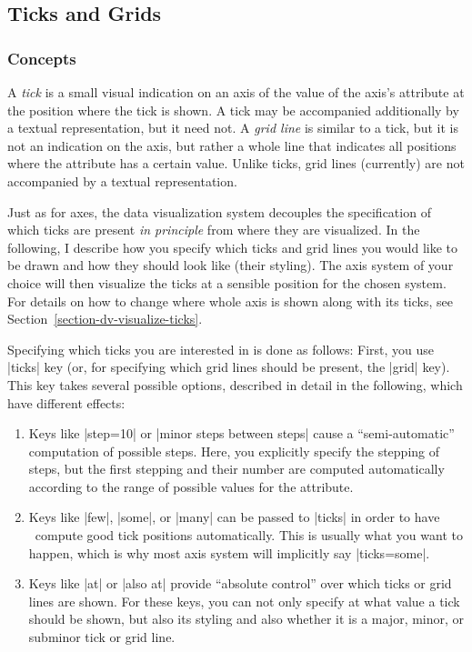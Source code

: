 \iffalse

\subsection{Ticks and Grids}
\label{section-dv-ticks-and-grids}

\subsubsection{Concepts}

A \emph{tick} is a small visual indication on an axis of the value of the axis's attribute at the position where the tick is shown. A tick may be accompanied additionally by a textual representation, but it need not. A \emph{grid line} is similar to a tick, but it is not an indication on the axis, but rather a whole line that indicates all positions where the attribute has a certain value. Unlike ticks, grid lines (currently) are not accompanied by a textual representation.

Just as for axes, the data visualization system decouples the specification of which ticks are present \emph{in principle} from where they are visualized. In the following, I describe how you specify which ticks and grid lines you would like to be drawn and how they should look like (their styling). The axis system of your choice will then visualize the ticks at a sensible position for the chosen system. For details on how to change where whole axis is shown along with its ticks, see Section~\ref{section-dv-visualize-ticks}.

Specifying which ticks you are interested in is done as follows: First, you use |ticks| key (or, for specifying which grid lines should be present, the |grid| key). This key takes several possible options, described in detail in the following, which have different effects:
%
\begin{enumerate}
    \item Keys like |step=10| or |minor steps between steps| cause a ``semi-automatic'' computation of possible steps. Here, you explicitly specify the stepping of steps, but the first stepping and their number are computed automatically according to the range of possible values for the attribute.
    \item Keys like |few|, |some|, or |many| can be passed to |ticks| in order to have \tikzname\ compute good tick positions automatically. This is usually what you want to happen, which is why most axis system will implicitly say |ticks={some}|.
    \item Keys like |at| or |also at| provide ``absolute control'' over which ticks or grid lines are shown. For these keys, you can not only specify at what value a tick should be shown, but also its styling and also whether it is a major, minor, or subminor tick or grid line.
\end{enumerate}

